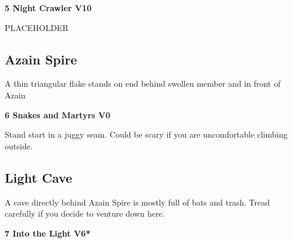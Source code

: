 \begin{multicols}{2}
\begin{minipage}{\columnwidth}
			\end{minipage}
			

					\begin{minipage}{\linewidth}	
					\label{rt:Night Crawler}
\colorbox{red!20}{
\parbox{0.95\textwidth}{
\textbf{
5 Night Crawler V10    
}
}
}

					\begin{adjustwidth}{0.5cm}{}				
					PLACEHOLDER
					\end{adjustwidth}
					\end{minipage}
			\begin{minipage}{\columnwidth}
			\subsection*{Azain Spire}\label{bf:Azain Spire}
			A thin triangular flake stands on end behind swollen member and in front of Azain
			
			\end{minipage}
			

					\begin{minipage}{\linewidth}	
					\label{rt:Snakes and Martyrs}
\colorbox{green!20}{
\parbox{0.95\textwidth}{
\textbf{
6 Snakes and Martyrs V0     
}
}
}

					\begin{adjustwidth}{0.5cm}{}				
					 Stand start in a juggy seam. Could be scary if you are uncomfortable climbing outside.
					\end{adjustwidth}
					\end{minipage}
			\begin{minipage}{\columnwidth}
			\subsection*{Light Cave}\label{bf:Light Cave}
			A cave directly behind Azain Spire is mostly full of bats and trash. Tread carefully if you decide to venture down here.
			
			\end{minipage}
			
					\begin{minipage}{\linewidth}	
					\label{rt:Into the Light}
\colorbox{RoyalBlue!20}{
\parbox{0.95\textwidth}{
\textbf{
7 Into the Light V6*  
}
}
}


\end{minipage}
\end{multicols}
